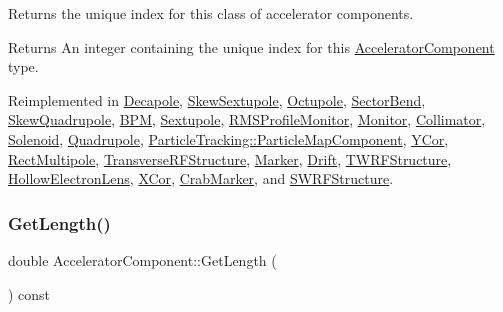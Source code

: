 Returns the unique index for this class of accelerator components. \begin{DoxyReturn}{Returns}
An integer containing the unique index for this \hyperlink{classAcceleratorComponent}{Accelerator\+Component} type. 
\end{DoxyReturn}


Reimplemented in \hyperlink{classDecapole_ac34dc3e11924c94ff4464cc0ca5ddf68}{Decapole}, \hyperlink{classSkewSextupole_a8dbbf55904005b051ad5d84a9140ab10}{Skew\+Sextupole}, \hyperlink{classOctupole_acf28f59d4bb7f7ad6729e23902915d2b}{Octupole}, \hyperlink{classSectorBend_a1af1ee7a97aa40bc6def14dec661eb3e}{Sector\+Bend}, \hyperlink{classSkewQuadrupole_aa3fb2801ec77a1d9d4d7a4d603c2b767}{Skew\+Quadrupole}, \hyperlink{classBPM_acaf99f021f92252962f2fbcbc24a2679}{B\+PM}, \hyperlink{classSextupole_ab86d63dda91c41c870c89069724681a2}{Sextupole}, \hyperlink{classRMSProfileMonitor_a87a98fa994d96c393a91500320242942}{R\+M\+S\+Profile\+Monitor}, \hyperlink{classMonitor_a38297eb50d06dd56201f2b48d92aa789}{Monitor}, \hyperlink{classCollimator_a158a9d8999d55a27efe4e56e5af8b56a}{Collimator}, \hyperlink{classSolenoid_a6aa64b57e6de710c77242d5e29a6ed8e}{Solenoid}, \hyperlink{classQuadrupole_a39b9e323df34c8db56f6daaaa112cf06}{Quadrupole}, \hyperlink{classParticleTracking_1_1ParticleMapComponent_a7fbbdf569b4535569771f5fc19fc0c76}{Particle\+Tracking\+::\+Particle\+Map\+Component}, \hyperlink{classYCor_a7e13236734c9ea7f52ecc2ee27523c4f}{Y\+Cor}, \hyperlink{classRectMultipole_a9bc789b2a193e341aab8bbd47a0e3ad4}{Rect\+Multipole}, \hyperlink{classTransverseRFStructure_ab19fe781495285c2b088da81fe3ccff0}{Transverse\+R\+F\+Structure}, \hyperlink{classMarker_a3453b35526a601d4c97d689b61f73454}{Marker}, \hyperlink{classDrift_a19bc19d48348912f8693e3ebbf9e92f2}{Drift}, \hyperlink{classTWRFStructure_a5a8ac2ad58e94158e840c5d296fbb53c}{T\+W\+R\+F\+Structure}, \hyperlink{classHollowElectronLens_a87c06909a695e81cb1abc546019e4e40}{Hollow\+Electron\+Lens}, \hyperlink{classXCor_abc1f1ab53804904384d6fadfcbaba5bb}{X\+Cor}, \hyperlink{classCrabMarker_ae8678c41613db9792f84faf3feb88f2b}{Crab\+Marker}, and \hyperlink{classSWRFStructure_aad7467d215cafd843e9a8ad551307ce2}{S\+W\+R\+F\+Structure}.

\mbox{\label{classAcceleratorComponent_a2922c29d1002d92dc6ecad4a64e5f61e}} 
\subsubsection{\texorpdfstring{Get\+Length()}{GetLength()}}
{\footnotesize\ttfamily double Accelerator\+Component\+::\+Get\+Length (\begin{DoxyParamCaption}{ }\end{DoxyParamCaption}) const}

